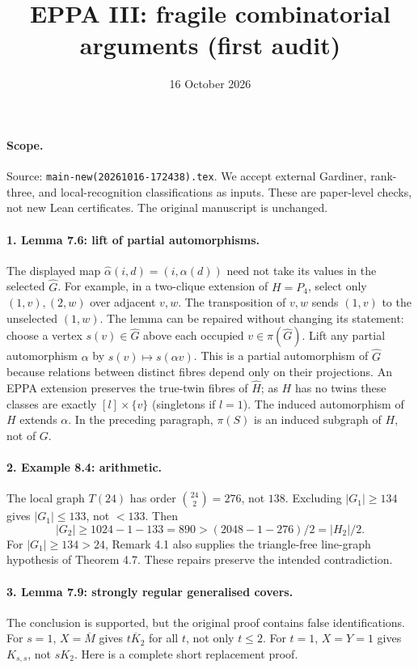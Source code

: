 \documentclass[11pt]{article}
\title{EPPA III: fragile combinatorial arguments (first audit)}
\date{16 October 2026}
\begin{document}
\maketitle
\paragraph{Scope.}
Source: \texttt{main-new(20261016-172438).tex}. We accept external
Gardiner, rank-three, and local-recognition classifications as inputs.
These are paper-level checks, not new Lean certificates.
The original manuscript is unchanged.

\paragraph{1. Lemma 7.6: lift of partial automorphisms.}
The displayed map $\widehat\alpha(i,d)=(i,\alpha(d))$ need not
take its values in the selected $\widehat G$.
For example, in a two-clique extension of $H=P_4$, select only
$(1,v),(2,w)$ over adjacent $v,w$. The transposition of
$v,w$ sends $(1,v)$ to the unselected $(1,w)$.
The lemma can be repaired without changing its statement:
choose a vertex $s(v)\in\widehat G$ above each occupied
$v\in\pi(\widehat G)$. Lift any partial automorphism
$\alpha$ by $s(v)\mapsto s(\alpha v)$. This is a partial
automorphism of $\widehat G$ because relations between
distinct fibres depend only on their projections.
An EPPA extension preserves the true-twin fibres of
$\widehat H$; as $H$ has no twins these classes are
exactly $[l]\times\{v\}$ (singletons if $l=1$).
The induced automorphism of $H$ extends $\alpha$.
In the preceding paragraph, $\pi(S)$ is an induced subgraph
of $H$, not of $G$.

\paragraph{2. Example 8.4: arithmetic.}
The local graph $T(24)$ has order $\binom{24}{2}=276$,
not $138$. Excluding $|G_1|\ge134$ gives $|G_1|\le133$,
not $<133$. Then
\[
 |G_2|\ge1024-1-133=890>(2048-1-276)/2=|H_2|/2.
\]
For $|G_1|\ge134>24$, Remark 4.1 also supplies the
triangle-free line-graph hypothesis of Theorem 4.7.
These repairs preserve the intended contradiction.

\paragraph{3. Lemma 7.9: strongly regular generalised covers.}
The conclusion is supported, but the original proof contains
false identifications. For $s=1$, $X=\overline M$ gives
$\overline{tK_2}$ for all $t$, not only $t\le2$.
For $t=1$, $X=Y=1$ gives $K_{s,s}$, not $sK_2$.
Here is a complete short replacement proof.
\end{document}
